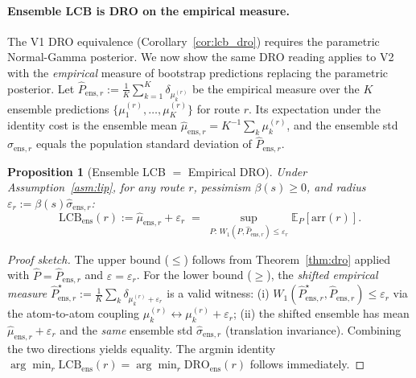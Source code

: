 \documentclass[11pt]{article}
\newtheorem{proposition}[theorem]{Proposition}
\theoremstyle{definition}
\theoremstyle{remark}
\begin{document}
\paragraph{Ensemble LCB is DRO on the empirical measure.}
The V1 DRO equivalence (Corollary~\ref{cor:lcb_dro}) requires the
parametric Normal-Gamma posterior. We now show the same DRO reading
applies to V2 with the \emph{empirical} measure of bootstrap predictions
replacing the parametric posterior. Let
$\hat{P}_{\mathrm{ens},r} := \tfrac{1}{K}\sum_{k=1}^{K}\delta_{\mu^{(r)}_k}$
be the empirical measure over the $K$ ensemble predictions
$\{\mu^{(r)}_1,\dots,\mu^{(r)}_K\}$ for route $r$.
Its expectation under the identity cost is the ensemble mean
$\hat\mu_{\mathrm{ens},r} = K^{-1}\sum_k \mu^{(r)}_k$, and the ensemble
std $\hat\sigma_{\mathrm{ens},r}$ equals the population standard
deviation of $\hat{P}_{\mathrm{ens},r}$.

\begin{proposition}[Ensemble LCB $=$ Empirical DRO]\label{prop:ensdro}
Under Assumption~\ref{asm:lip}, for any route $r$, pessimism $\beta(s)\geq 0$,
and radius $\varepsilon_r := \beta(s)\hat\sigma_{\mathrm{ens},r}$:
\[
\mathrm{LCB}_{\mathrm{ens}}(r)
:= \hat\mu_{\mathrm{ens},r} + \varepsilon_r
\;=\;
\sup_{P:\,W_1(P,\hat{P}_{\mathrm{ens},r})\leq\varepsilon_r}\mathbb{E}_P[\mathrm{arr}(r)].
\]
\end{proposition}

\begin{proof}[Proof sketch]
The upper bound ($\leq$) follows from Theorem~\ref{thm:dro} applied with
$\hat{P} = \hat{P}_{\mathrm{ens},r}$ and $\varepsilon = \varepsilon_r$.
For the lower bound ($\geq$), the \emph{shifted empirical measure}
$\hat{P}^{\star}_{\mathrm{ens},r} := \tfrac{1}{K}\sum_k \delta_{\mu^{(r)}_k + \varepsilon_r}$
is a valid witness:
(i) $W_1(\hat{P}^{\star}_{\mathrm{ens},r}, \hat{P}_{\mathrm{ens},r}) \leq \varepsilon_r$
via the atom-to-atom coupling $\mu^{(r)}_k \leftrightarrow \mu^{(r)}_k + \varepsilon_r$;
(ii) the shifted ensemble has mean $\hat\mu_{\mathrm{ens},r} + \varepsilon_r$
and the \emph{same} ensemble std $\hat\sigma_{\mathrm{ens},r}$ (translation
invariance). Combining the two directions yields equality. The argmin
identity
$\arg\min_r \mathrm{LCB}_{\mathrm{ens}}(r) = \arg\min_r \mathrm{DRO}_{\mathrm{ens}}(r)$
follows immediately.
\end{proof}
\end{document}
